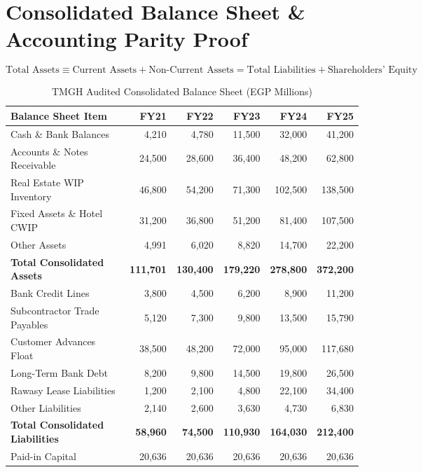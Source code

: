 \documentclass[11pt,a4paper]{report}
\begin{document}
\chapter{Consolidated Balance Sheet \& Accounting Parity Proof}

\begin{equation}
\text{Total Assets} \equiv \text{Current Assets} + \text{Non-Current Assets} = \text{Total Liabilities} + \text{Shareholders' Equity}
\end{equation}

\begin{table}[h]
\centering
\small
\caption{TMGH Audited Consolidated Balance Sheet (EGP Millions)}
\begin{tabular}{lrrrrr}
\toprule
\textbf{Balance Sheet Item} & \textbf{FY21} & \textbf{FY22} & \textbf{FY23} & \textbf{FY24} & \textbf{FY25} \\
\midrule
Cash \& Bank Balances & 4,210 & 4,780 & 11,500 & 32,000 & 41,200 \\
Accounts \& Notes Receivable & 24,500 & 28,600 & 36,400 & 48,200 & 62,800 \\
Real Estate WIP Inventory & 46,800 & 54,200 & 71,300 & 102,500 & 138,500 \\
Fixed Assets \& Hotel CWIP & 31,200 & 36,800 & 51,200 & 81,400 & 107,500 \\
Other Assets & 4,991 & 6,020 & 8,820 & 14,700 & 22,200 \\
\midrule
\textbf{Total Consolidated Assets} & \textbf{111,701} & \textbf{130,400} & \textbf{179,220} & \textbf{278,800} & \textbf{372,200} \\
\midrule
Bank Credit Lines & 3,800 & 4,500 & 6,200 & 8,900 & 11,200 \\
Subcontractor Trade Payables & 5,120 & 7,300 & 9,800 & 13,500 & 15,790 \\
Customer Advances Float & 38,500 & 48,200 & 72,000 & 95,000 & 117,680 \\
Long-Term Bank Debt & 8,200 & 9,800 & 14,500 & 19,800 & 26,500 \\
Rawasy Lease Liabilities & 1,200 & 2,100 & 4,800 & 22,100 & 34,400 \\
Other Liabilities & 2,140 & 2,600 & 3,630 & 4,730 & 6,830 \\
\midrule
\textbf{Total Consolidated Liabilities} & \textbf{58,960} & \textbf{74,500} & \textbf{110,930} & \textbf{164,030} & \textbf{212,400} \\
\midrule
Paid-in Capital & 20,636 & 20,636 & 20,636 & 20,636 & 20,636 \\

\end{tabular}
\end{table}
\end{document}
